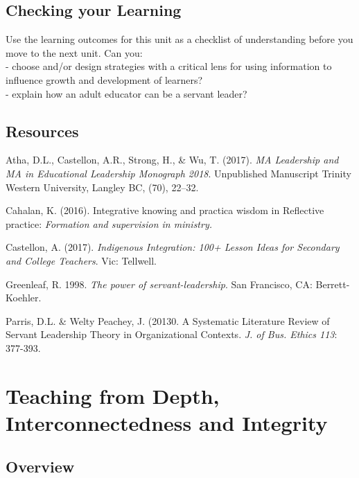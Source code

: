 \documentclass[
]{book}
\begin{document}
\hypertarget{checking-your-learning-6}{%
\section{Checking your Learning}\label{checking-your-learning-6}}

\begin{progress}
Use the learning outcomes for this unit as a checklist of understanding
before you move to the next unit. Can you:\\
- choose and/or design strategies with a critical lens for using
information to influence growth and development of learners?\\
- explain how an adult educator can be a servant leader?
\end{progress}

\hypertarget{resources-1}{%
\section{Resources}\label{resources-1}}

Atha, D.L., Castellon, A.R., Strong, H., \& Wu, T. (2017). \emph{MA Leadership and MA
in Educational Leadership Monograph 2018}. Unpublished Manuscript Trinity
Western University, Langley BC, (70), 22--32.

Cahalan, K. (2016). Integrative knowing and practica wisdom in Reflective
practice: \emph{Formation and supervision in ministry.}

Castellon, A. (2017). \emph{Indigenous Integration: 100+ Lesson Ideas for Secondary
and College Teachers}. Vic: Tellwell.

Greenleaf, R. 1998. \emph{The power of servant-leadership}. San Francisco, CA:
Berrett-Koehler.

Parris, D.L. \& Welty Peachey, J. (20130. A Systematic Literature Review of
Servant Leadership Theory in Organizational Contexts. \emph{J. of Bus. Ethics 113}:
377-393.

\hypertarget{teaching-from-depth-interconnectedness-and-integrity}{%
\chapter{Teaching from Depth, Interconnectedness and Integrity}\label{teaching-from-depth-interconnectedness-and-integrity}}

\hypertarget{overview-7}{%
\section*{Overview}\label{overview-7}}
\end{document}

